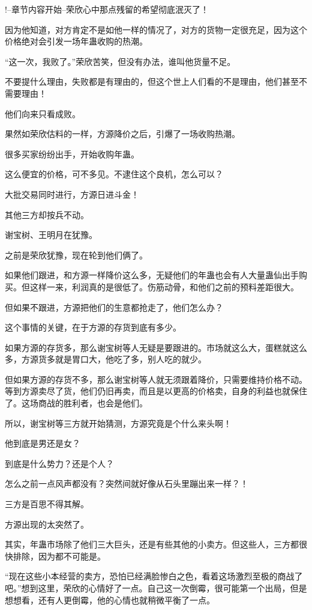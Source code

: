 
\begin{this_body}

!--章节内容开始--荣欣心中那点残留的希望彻底泯灭了！

因为他知道，对方肯定不是如他一样的情况了，对方的货物一定很充足，因为这个价格绝对会引发一场年蛊收购的热潮。

“这一次，我败了。”荣欣苦笑，但没有办法，谁叫他货量不足。

不要提什么理由，失败都是有理由的，但这个世上人们看的不是理由，他们甚至不需要理由！

他们向来只看成败。

果然如荣欣估料的一样，方源降价之后，引爆了一场收购热潮。

很多买家纷纷出手，开始收购年蛊。

这么便宜的价格，可不多见。不逮住这个良机，怎么可以？

大批交易同时进行，方源日进斗金！

其他三方却按兵不动。

谢宝树、王明月在犹豫。

之前是荣欣犹豫，现在轮到他们俩了。

如果他们跟进，和方源一样降价这么多，无疑他们的年蛊也会有人大量蛊仙出手购买。但这样一来，利润真的是很低了。伤筋动骨，和他们之前的预料差距很大。

但如果不跟进，方源把他们的生意都抢走了，他们怎么办？

这个事情的关键，在于方源的存货到底有多少。

如果方源的存货多，那么谢宝树等人无疑是要跟进的。市场就这么大，蛋糕就这么多，方源货多就是胃口大，他吃了多，别人吃的就少。

但如果方源的存货不多，那么谢宝树等人就无须跟着降价，只需要维持价格不动。等到方源卖尽了货，他们仍旧再卖，而且是以更高的价格卖，自身的利益也就保住了。这场商战的胜利者，也会是他们。

所以，谢宝树等三方就开始猜测，方源究竟是个什么来头啊！

他到底是男还是女？

到底是什么势力？还是个人？

怎么之前一点风声都没有？突然间就好像从石头里蹦出来一样？！

三方是百思不得其解。

方源出现的太突然了。

其实，年蛊市场除了他们三大巨头，还是有些其他的小卖方。但这些人，三方都很快排除，因为都不可能是。

“现在这些小本经营的卖方，恐怕已经满脸惨白之色，看着这场激烈至极的商战了吧。”想到这里，荣欣的心情好了一点。自己这一次倒霉，很可能第一个出局，但是想想看，还有人更倒霉，他的心情也就稍微平衡了一点。


\end{this_body}
